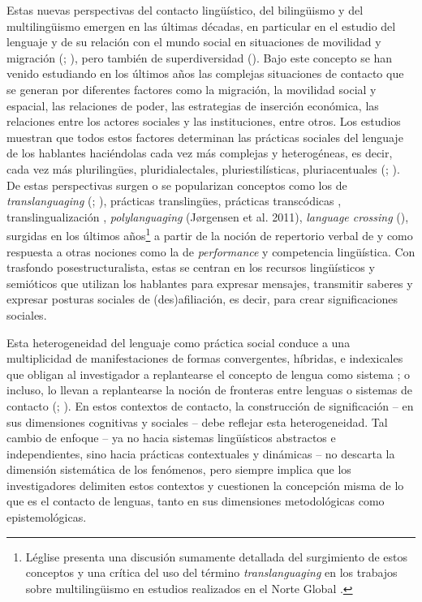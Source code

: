 \documentclass[output=paper]{langscibook}
\begin{document}
Estas nuevas perspectivas del contacto lingüístico, del bilingüismo y del multilingüismo emergen en las últimas décadas, en particular en el estudio del lenguaje y de su relación con el mundo social en situaciones de movilidad y migración (\citealt{Blommaert2010}; \citealt{Gugenberger2010,Gugenberger2013}), pero también de superdiversidad (\citealt{Vertovec2007,BlommaertRampton2011,JørgensenEtAl2011}). Bajo este concepto se han venido estudiando en los últimos años las complejas situaciones de contacto que se generan por diferentes factores como la migración, la movilidad social y espacial, las relaciones de poder, las estrategias de inserción económica, las relaciones entre los actores sociales y las instituciones, entre otros.  Los estudios muestran que todos estos factores determinan las prácticas sociales del lenguaje de los hablantes haciéndolas cada vez más complejas y heterogéneas, es decir, cada vez más plurilingües, pluridialectales, pluriestilísticas, pluriacentuales (\citealt{Léglise2013}; \citealt{LégliseAlby2013}). De estas perspectivas surgen o se popularizan conceptos como los de \textit{translanguaging} (\citealt{García2009}; \citealt{GarcíaWei2014}), prácticas translingües, prácticas transcódicas \citep{Lüdi1987}, translingualización \citep{Zimmermann2019}, \textit{polylanguaging} (Jørgensen et al. 2011), \textit{language crossing} (\citealt{Rampton1995,Rampton2005}),  surgidas en los últimos años\footnote{Léglise presenta una discusión sumamente detallada del surgimiento de estos conceptos \citep{Léglise2018} y una crítica del uso del término \textit{translanguaging} en los trabajos sobre multilingüismo en estudios realizados en el Norte Global \citep{Legliseenprensa}.}  a partir de la noción de repertorio verbal de \citet{Gumperz1964} y como respuesta a otras nociones como la de \textit{performance} y competencia lingüística.  Con trasfondo posestructuralista, estas se centran en los recursos lingüísticos y semióticos que utilizan los hablantes para expresar mensajes, transmitir saberes y expresar posturas sociales de (des)afiliación, es decir, para crear significaciones sociales.

Esta heterogeneidad del lenguaje como práctica social conduce a una multiplicidad de manifestaciones de formas convergentes, híbridas, e indexicales que obligan al investigador a replantearse el concepto de lengua como sistema \citep{MakoniPennycook2005}; o incluso, lo llevan a replantearse la noción de fronteras entre lenguas o sistemas de contacto (\citealt{Léglise2018}; \citealt{AuzanneauGreco2018}). En estos contextos de contacto, la construcción de significación -- en sus dimensiones cognitivas y sociales -- debe reflejar esta heterogeneidad. Tal cambio de enfoque -- ya no hacia sistemas lingüísticos abstractos e independientes, sino hacia prácticas contextuales y dinámicas -- no descarta la dimensión sistemática de los fenómenos, pero siempre implica que los investigadores delimiten estos contextos y cuestionen la concepción misma de lo que es el contacto de lenguas, tanto en sus dimensiones metodológicas como epistemológicas.
\end{document}

